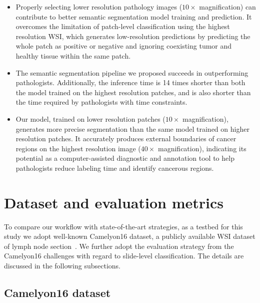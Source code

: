 \begin{itemize}
\item Properly selecting lower resolution pathology images ($10\times$ magnification) can contribute to better semantic segmentation model training and prediction. It overcomes the limitation of patch-level classification using the highest resolution WSI, which generates low-resolution predictions by predicting the whole patch as positive or negative and ignoring coexisting tumor and healthy tissue within the same patch.
\item The semantic segmentation pipeline we proposed succeeds in outperforming pathologists. Additionally, the inference time is 14 times shorter than both the model trained on the highest resolution patches, and is also shorter than the time required by pathologists with time constraints.
\item Our model, trained on lower resolution patches ($10\times$ magnification), generates more precise segmentation than the same model trained on higher resolution patches. It accurately produces external boundaries of cancer regions on the highest resolution image ($40\times$ magnification), indicating its potential as a computer-assisted diagnostic and annotation tool to help pathologists reduce labeling time and identify cancerous regions.
\end{itemize}

\section{Dataset and evaluation metrics}\label{se:3-2}

To compare our workflow with state-of-the-art strategies, as a testbed for this study we adopt well-known Camelyon16 dataset, a publicly available WSI dataset of lymph node section~\cite{Bejnordi2017}. We further adopt the evaluation strategy from the Camelyon16 challenges with regard to  slide-level classification. The details are discussed in the following subsections.

\subsection{Camelyon16 dataset}\label{se:3-2.1}


